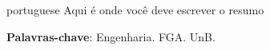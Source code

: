 \begin{resumo}[Resumo]
 \begin{otherlanguage*}{portuguese}
   Aqui é onde você deve escrever o resumo
   \vspace{\onelineskip}
 
   \noindent 
   \textbf{Palavras-chave}: Engenharia. FGA. UnB.
 \end{otherlanguage*}
\end{resumo}
